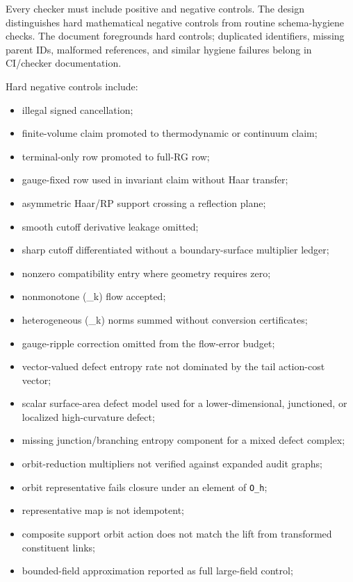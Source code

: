 \documentclass[
]{article}
\providecommand{\tightlist}{%
  \setlength{\itemsep}{0pt}\setlength{\parskip}{0pt}}
\begin{document}
Every checker must include positive and negative controls. The design
distinguishes hard mathematical negative controls from routine
schema-hygiene checks. The document foregrounds hard controls;
duplicated identifiers, missing parent IDs, malformed references, and
similar hygiene failures belong in CI/checker documentation.

Hard negative controls include:

\begin{itemize}
\tightlist
\item
  illegal signed cancellation;
\item
  finite-volume claim promoted to thermodynamic or continuum claim;
\item
  terminal-only row promoted to full-RG row;
\item
  gauge-fixed row used in invariant claim without Haar transfer;
\item
  asymmetric Haar/RP support crossing a reflection plane;
\item
  smooth cutoff derivative leakage omitted;
\item
  sharp cutoff differentiated without a boundary-surface multiplier
  ledger;
\item
  nonzero compatibility entry where geometry requires zero;
\item
  nonmonotone (\beta\_k) flow accepted;
\item
  heterogeneous (\Delta\_k) norms summed without conversion
  certificates;
\item
  gauge-ripple correction omitted from the flow-error budget;
\item
  vector-valued defect entropy rate not dominated by the tail
  action-cost vector;
\item
  scalar surface-area defect model used for a lower-dimensional,
  junctioned, or localized high-curvature defect;
\item
  missing junction/branching entropy component for a mixed defect
  complex;
\item
  orbit-reduction multipliers not verified against expanded audit
  graphs;
\item
  orbit representative fails closure under an element of \texttt{O\_h};
\item
  representative map is not idempotent;
\item
  composite support orbit action does not match the lift from
  transformed constituent links;
\item
  bounded-field approximation reported as full large-field control;

\end{itemize}
\end{document}
